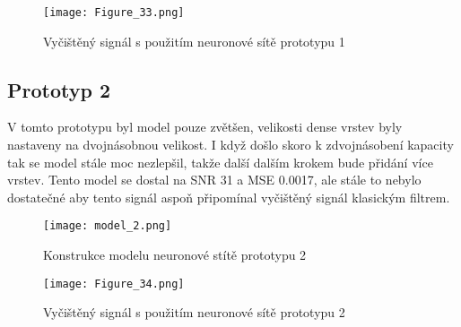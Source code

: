 \begin{landscape}
\begin{figure}[H] 
	\centering
	\texttt{[image: Figure\_33.png]}
	\caption{Vyčištěný signál s použitím neuronové sítě prototypu 1}
\end{figure}
\end{landscape}


\subsection{Prototyp 2}

V tomto prototypu byl model pouze zvětšen, velikosti dense vrstev byly nastaveny na dvojnásobnou velikost. I když došlo skoro k zdvojnásobení kapacity tak se model stále moc nezlepšil, takže další dalším krokem bude přidání více vrstev.
Tento model se dostal na SNR 31 a MSE 0.0017, ale stále to nebylo dostatečné aby tento signál aspoň připomínal vyčištěný signál klasickým filtrem.

\begin{figure}[H] 
	\centering
	\texttt{[image: model\_2.png]}
	\caption{Konstrukce modelu neuronové stítě prototypu 2}
\end{figure}

\begin{landscape}
	\begin{figure}[H] 
		\centering
		\texttt{[image: Figure\_34.png]}
		\caption{Vyčištěný signál s použitím neuronové sítě prototypu 2}
	\end{figure}
	\end{landscape}